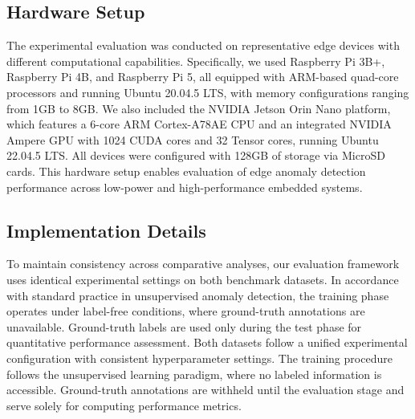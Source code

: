 \documentclass[pdflatex,sn-mathphys-num]{sn-jnl}
\theoremstyle{thmstyleone}
\theoremstyle{thmstyletwo}
\theoremstyle{thmstylethree}
\begin{document}
\subsection{Hardware Setup}
\begin{table}
\centering
\caption{Detailed Hardware Specification of the testbed for AEABA-CPS.} \label{tab:hardwares}
\renewcommand\arraystretch{1.8}
\end{table}
The experimental evaluation was conducted on representative edge devices with different computational capabilities. Specifically, we used Raspberry Pi 3B+, Raspberry Pi 4B, and Raspberry Pi 5, all equipped with ARM-based quad-core processors and running Ubuntu 20.04.5 LTS, with memory configurations ranging from 1GB to 8GB. 
We also included the NVIDIA Jetson Orin Nano platform, which features a 6-core ARM Cortex-A78AE CPU and an integrated NVIDIA Ampere GPU with 1024 CUDA cores and 32 Tensor cores, running Ubuntu 22.04.5 LTS. All devices were configured with 128GB of storage via MicroSD cards. This hardware setup enables evaluation of edge anomaly detection performance across low-power and high-performance embedded systems.



\subsection{Implementation Details}
To maintain consistency across comparative analyses, our evaluation framework uses identical experimental settings on both benchmark datasets. In accordance with standard practice in unsupervised anomaly detection, the training phase operates under label-free conditions, where ground-truth annotations are unavailable. Ground-truth labels are used only during the test phase for quantitative performance assessment. 
Both datasets follow a unified experimental configuration with consistent hyperparameter settings. The training procedure follows the unsupervised learning paradigm, where no labeled information is accessible. Ground-truth annotations are withheld until the evaluation stage and serve solely for computing performance metrics.
\end{document}
